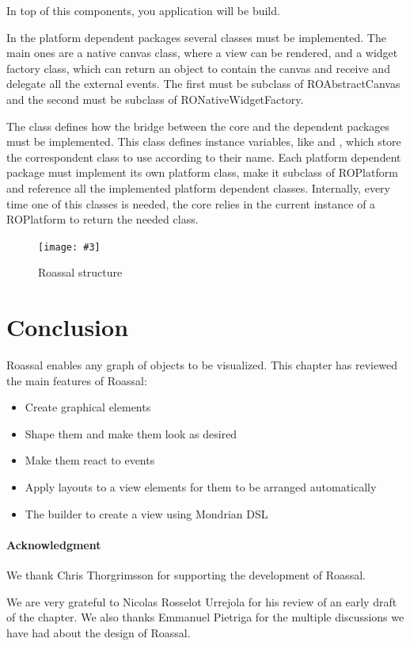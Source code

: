 \documentclass[a4paper,10pt,twoside]{book}
\newcommand{\fig}[4]{
		\begin{figure}[#1]
			\centering
			\texttt{[image: \#3]}
			\caption{\label{fig:#3}#4}
		\end{figure}}
\begin{document}
In top of this components, you application will be build.

In the platform dependent packages several classes must be implemented. The main ones are a native canvas class, where a view can be rendered, and a widget factory class, which can return an object to contain the canvas and receive and delegate all the external events.
The first must be subclass of ROAbstractCanvas and the second must be subclass of RONativeWidgetFactory.

The  class defines how the bridge between the core and the dependent packages must be implemented. This class defines instance variables, like  and , which store the correspondent class to use according to their name. Each platform dependent package must implement its own platform class, make it subclass of ROPlatform and reference all the implemented platform dependent classes.
Internally, every time one of this classes is needed, the core relies in the current instance of a ROPlatform to return the needed class.

\fig{H}{0.3}{structure}{Roassal structure}



\section{Conclusion}

Roassal enables any graph of objects to be visualized. This chapter has reviewed the main features of Roassal:

\begin{itemize}
\item Create graphical elements
\item Shape them and make them look as desired
\item Make them react to events
\item Apply layouts to a view elements for them to be arranged automatically 
\item The builder to create a view using Mondrian DSL
\end{itemize}

\paragraph{Acknowledgment}
We thank Chris Thorgrimsson for supporting the development of Roassal.

We are very grateful to Nicolas Rosselot Urrejola for his review of an early draft of the chapter. We also thanks Emmanuel Pietriga for the multiple discussions we have had about the design of Roassal. 

%
%


\ifx\wholebook\relax\else
   
   
\end{document}
